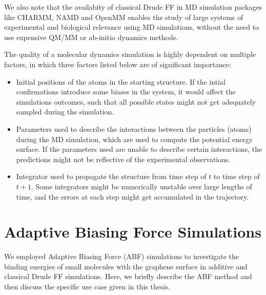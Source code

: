     We also note that the availabity of classical Drude FF in MD simulation packages like CHARMM\supercite{brooks_charmm_1983,brooks_charmm_2009}, NAMD\supercite{phillips_scalable_2005,phillips_scalable_2020} and OpenMM\supercite{eastman_openmm_2010,eastman_openmm_2017} enables the study of large systems of experimental and biological relevance using MD simulations, without the need to use expensive QM/MM or ab-initio dynamics methods.

The quality of a molecular dynamics simulation is highly dependent on multiple factors, in which three factors listed below are of significant importance:
\begin{itemize}
    \item Initial positions of the atoms in the starting structure. If the intial confirmations introduce some biases in the system, it would affect the simulations outcomes, such that all possible states might not get adequately sampled during the simulation.
    \item Parameters used to describe the interactions between the particles (atoms) during the MD simulation, which are used to compute the potential energy surface. If the parameters used are unable to describe certain interactions, the predictions might not be reflective of the experimental observations.
    \item Integrator used to propagate the structure from time step of $t$ to time step of $t+1$. Some integrators might be numerically unstable over large lengths of time, and the errors at each step might get accumulated in the trajectory.
\end{itemize}

\section{Adaptive Biasing Force Simulations}
We employed Adaptive Biasing Force (ABF) simulations to investigate the binding energies of small molecules with the graphene surface in additive and classical Drude FF simulations. Here, we briefly describe the ABF method and then discuss the specific use case given in this thesis.

